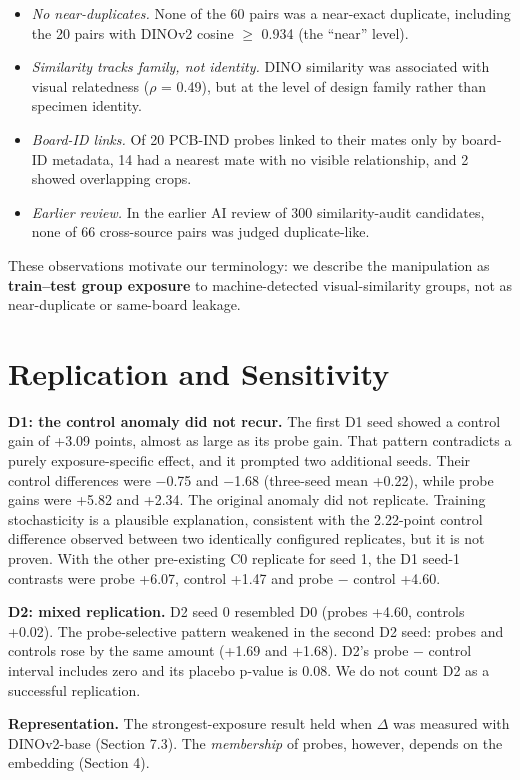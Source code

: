 \documentclass[11pt]{article}
\begin{document}
\begin{itemize}
\item \emph{No near-duplicates.} None of the 60 pairs was a near-exact duplicate, including the 20 pairs with DINOv2 cosine $\geq$ 0.934 (the ``near'' level).
\item \emph{Similarity tracks family, not identity.} DINO similarity was associated with visual relatedness ($\rho$ = 0.49), but at the level of design family rather than specimen identity.
\item \emph{Board-ID links.} Of 20 PCB-IND probes linked to their mates only by board-ID metadata, 14 had a nearest mate with no visible relationship, and 2 showed overlapping crops.
\item \emph{Earlier review.} In the earlier AI review of 300 similarity-audit candidates, none of 66 cross-source pairs was judged duplicate-like.
\end{itemize}
These observations motivate our terminology: we describe the manipulation as \textbf{train--test group exposure} to machine-detected visual-similarity groups, not as near-duplicate or same-board leakage.

\section{Replication and Sensitivity}
\textbf{D1: the control anomaly did not recur.} The first D1 seed showed a control gain of +3.09 points, almost as large as its probe gain. That pattern contradicts a purely exposure-specific effect, and it prompted two additional seeds. Their control differences were $-$0.75 and $-$1.68 (three-seed mean +0.22), while probe gains were +5.82 and +2.34. The original anomaly did not replicate. Training stochasticity is a plausible explanation, consistent with the 2.22-point control difference observed between two identically configured replicates, but it is not proven. With the other pre-existing C0 replicate for seed 1, the D1 seed-1 contrasts were probe +6.07, control +1.47 and probe $-$ control +4.60.

\textbf{D2: mixed replication.} D2 seed 0 resembled D0 (probes +4.60, controls +0.02). The probe-selective pattern weakened in the second D2 seed: probes and controls rose by the same amount (+1.69 and +1.68). D2's probe $-$ control interval includes zero and its placebo p-value is 0.08. We do not count D2 as a successful replication.

\textbf{Representation.} The strongest-exposure result held when $\Delta$ was measured with DINOv2-base (Section 7.3). The \emph{membership} of probes, however, depends on the embedding (Section 4).
\end{document}
